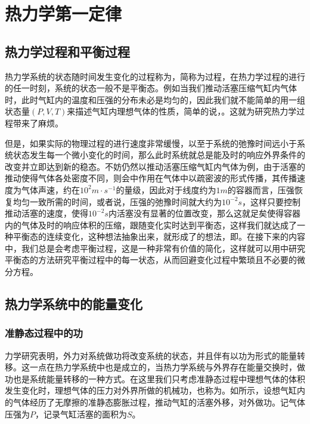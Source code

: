 \section{热力学第一定律}

\subsection{热力学过程和平衡过程}
热力学系统的状态随时间发生变化的过程称为，简称为过程，在热力学过程的进行的任一时刻，系统的状态一般不是平衡态。例如当我们推动活塞压缩气缸内气体时，此时气缸内的温度和压强的分布未必是均匀的，因此我们就不能简单的用一组状态量$(P,V,T)$来描述气缸内理想气体的性质，简单的说，。这就为研究热力学过程带来了麻烦。

但是，如果实际的物理过程的进行速度非常缓慢，以至于系统的弛豫时间远小于系统状态发生每一个微小变化的时间，那么此时系统就总是能及时的响应外界条件的改变并立即达到新的稳态。不妨仍然以推动活塞压缩气缸内气体为例，由于活塞的推动使得气体各处密度不同，则会中作用在气体中以疏密波的形式传播，其传播速度为气体声速，约在$10^2\si{m\cdot s^{-1}}$的量级，因此对于线度约为$1\si{m}$的容器而言，压强恢复均匀一致所需的时间，或者说，压强的弛豫时间就大约为$10^{-2}\si{s}$，这样只要控制推动活塞的速度，使得$10^{-2}\si{s}$内活塞没有显著的位置改变，那么这就足矣使得容器内的气体及时的响应体积的压缩，跟随变化实时达到平衡态，这样我们就达成了一种平衡态的连续变化，这种想法抽象出来，就形成了的想法，即。在接下来的内容中，我们总是会考虑平衡过程，这是一种非常有价值的简化，这样就可以用中研究平衡态的方法研究平衡过程中的每一状态，从而回避变化过程中繁琐且不必要的微分方程。

\subsection{热力学系统中的能量变化}

\subsubsection{准静态过程中的功}
力学研究表明，外力对系统做功将改变系统的状态，并且伴有以功为形式的能量转移。这一点在热力学系统中也是成立的，当热力学系统与外界存在能量交换时，做功也是系统能量转移的一种方式。在这里我们只考虑准静态过程中理想气体的体积发生变化时，理想气体的压力对外界所做的机械功，也称为。如所示，设想气缸内的气体经历了无摩擦的准静态膨胀过程，推动气缸的活塞外移，对外做功。记气体压强为$P$，记录气缸活塞的面积为$S$。

